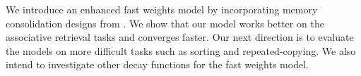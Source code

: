 \documentclass[portrait,a0b,final,a4resizeable]{include/a0poster}
\begin{document}
\begin{poster}
\begin{multicols}{3}
\vspace{1.cm}
We introduce an enhanced fast weights model by incorporating memory consolidation designs from \cite{pld}.
We show that our model works better on the associative retrieval tasks and converges faster.
Our next direction is to evaluate the models on more difficult tasks such as sorting and repeated-copying.
We also intend to investigate other decay functions for the fast weights model.

\vspace{1.cm}

\small
\begingroup
\renewcommand{\section}[2]{}%

\endgroup


 
\end{multicols}
\end{poster}
\end{document}
